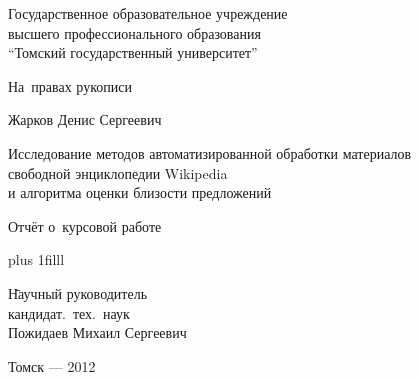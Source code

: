 
\thispagestyle{empty}
\begin{center}
Государственное образовательное учреждение\\
высшего профессионального образования\\
``Томский государственный университет''
\end{center}

\vspace{1cm}

\begin{flushright}
На~правах рукописи
\end{flushright}

\vspace{1cm}

\begin{center}

Жарков Денис Сергеевич

\vspace{1cm}

Исследование методов автоматизированной обработки материалов \\ 
свободной энциклопедии Wikipedia\\
и алгоритма оценки близости предложений

\vspace{2.0cm}

Отчёт о~курсовой работе

\end{center}

\vskip 0pt plus 1filll

\begin{tabbing}
\hspace{10cm} \= Научный руководитель\\
\> кандидат.~тех.~наук\\
\> Пожидаев Михаил Сергеевич\\
\end{tabbing}

\vspace*{1cm}

\begin{center}
Томск --- 2012
\end{center}
